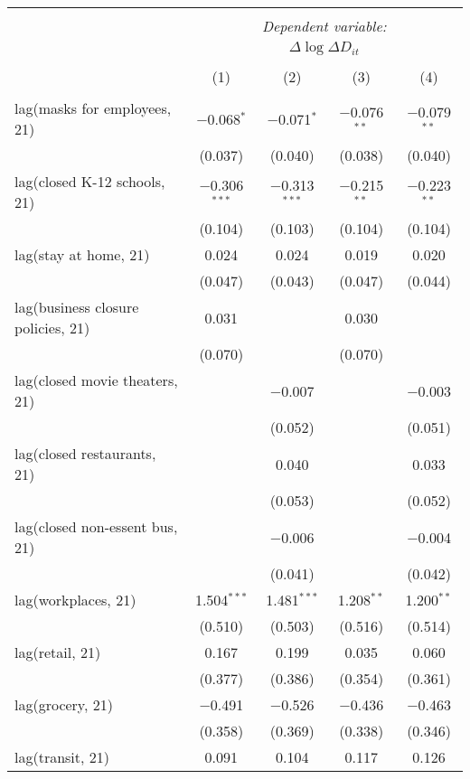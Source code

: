 \begin{tabular}{@{\extracolsep{1pt}}lcccc} 
\\[-1.8ex]\hline 
\hline \\[-1.8ex] 
 & \multicolumn{4}{c}{\textit{Dependent variable:}} \\ 
\cline{2-5} 
 & \multicolumn{4}{c}{$\Delta \log \Delta D_{it}$} \\ 
\\[-1.8ex] & (1) & (2) & (3) & (4)\\ 
\hline \\[-1.8ex] 
 lag(masks for employees, 21) & $-$0.068$^{*}$ & $-$0.071$^{*}$ & $-$0.076$^{**}$ & $-$0.079$^{**}$ \\ 
  & (0.037) & (0.040) & (0.038) & (0.040) \\ 
  lag(closed K-12 schools, 21) & $-$0.306$^{***}$ & $-$0.313$^{***}$ & $-$0.215$^{**}$ & $-$0.223$^{**}$ \\ 
  & (0.104) & (0.103) & (0.104) & (0.104) \\ 
  lag(stay at home, 21) & 0.024 & 0.024 & 0.019 & 0.020 \\ 
  & (0.047) & (0.043) & (0.047) & (0.044) \\ 
  lag(business closure policies, 21) & 0.031 &  & 0.030 &  \\ 
  & (0.070) &  & (0.070) &  \\ 
  lag(closed movie theaters, 21) &  & $-$0.007 &  & $-$0.003 \\ 
  &  & (0.052) &  & (0.051) \\ 
  lag(closed restaurants, 21) &  & 0.040 &  & 0.033 \\ 
  &  & (0.053) &  & (0.052) \\ 
  lag(closed non-essent bus, 21) &  & $-$0.006 &  & $-$0.004 \\ 
  &  & (0.041) &  & (0.042) \\ 
  lag(workplaces, 21) & 1.504$^{***}$ & 1.481$^{***}$ & 1.208$^{**}$ & 1.200$^{**}$ \\ 
  & (0.510) & (0.503) & (0.516) & (0.514) \\ 
  lag(retail, 21) & 0.167 & 0.199 & 0.035 & 0.060 \\ 
  & (0.377) & (0.386) & (0.354) & (0.361) \\ 
  lag(grocery, 21) & $-$0.491 & $-$0.526 & $-$0.436 & $-$0.463 \\ 
  & (0.358) & (0.369) & (0.338) & (0.346) \\ 
  lag(transit, 21) & 0.091 & 0.104 & 0.117 & 0.126 \\ 

\end{tabular}
